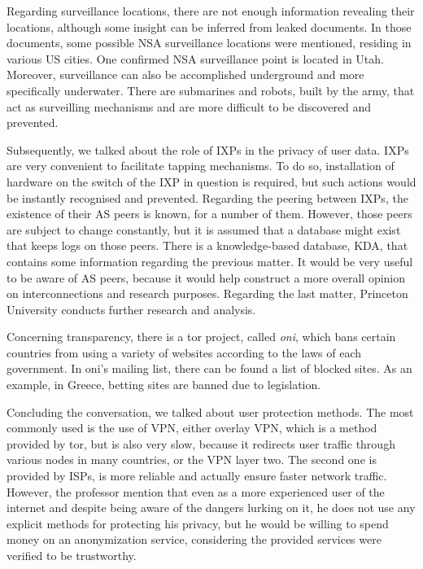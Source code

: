 Regarding surveillance locations, there are not enough information revealing 
their locations, although some insight can be inferred from leaked documents. 
In those documents, some possible NSA surveillance locations were mentioned, 
residing in various US cities. One confirmed NSA surveillance point is located 
in Utah. Moreover, surveillance can also be accomplished underground and more 
specifically underwater. There are submarines and robots, built by the army, 
that act as surveilling mechanisms and are more difficult to be discovered and 
prevented.

Subsequently, we talked about the role of IXPs in the privacy of user data. IXPs 
are very convenient to facilitate tapping mechanisms. To do so, installation of 
hardware on the switch of the IXP in question is required, but such actions 
would be instantly recognised and prevented. Regarding the peering between IXPs, 
the existence of their AS peers is known, for a number of them. However, those 
peers are subject to change constantly, but it is assumed that a database might 
exist that keeps logs on those peers. There is a knowledge-based database, KDA, 
that contains some information regarding the previous matter. It would be very 
useful to be aware of AS peers, because it would help construct a more overall 
opinion on interconnections and research purposes. Regarding the last matter, 
Princeton University conducts further research and analysis.

Concerning transparency, there is a tor project, called \emph{oni}, which bans 
certain countries from using a variety of websites according to the laws of each 
government. In oni's mailing list, there can be found a list of blocked sites. 
As an example, in Greece, betting sites are banned due to legislation.

Concluding the conversation, we talked about user protection methods. The most 
commonly used is the use of VPN, either overlay VPN, which is a method provided 
by tor, but is also very slow, because it redirects user traffic through various 
nodes in many countries, or the VPN layer two. The second one is provided by 
ISPs, is more reliable and actually ensure faster network traffic. However, the 
professor mention that even as a more experienced user of the internet and 
despite being aware of the dangers lurking on it, he does not use any explicit 
methods for protecting his privacy, but he would be willing to spend money on an 
anonymization service, considering the provided services were verified to be 
trustworthy.

